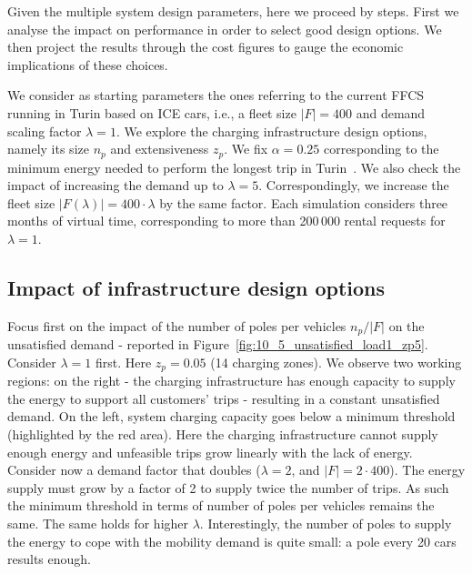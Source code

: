 Given the multiple system design parameters, here we proceed by steps. First we analyse the impact on performance in order to select good design options. We then project the results through the cost figures to gauge the economic implications of these choices.

We consider as starting parameters the ones referring to the current FFCS running in Turin based on ICE cars, i.e., a fleet size $|F|=400$ and demand scaling factor $\lambda=1$. We explore the charging infrastructure design options, namely its size $n_p$ and extensiveness $z_p$. We fix $\alpha=0.25$ corresponding to the minimum energy needed to perform the longest trip in Turin~\cite{7_cocca2019free}.
We also check the impact of increasing the demand up to $\lambda=5$. Correspondingly, we increase the fleet size $|F(\lambda)|=400\cdot \lambda$ by the same factor. Each simulation considers three months of virtual time, corresponding to more than 200\,000 rental requests for $\lambda=1$.

\subsection{Impact of infrastructure design options}

Focus first on the impact of the number of poles per vehicles $n_p/|F|$ on the unsatisfied demand - reported in Figure~\ref{fig:10_5_unsatisfied_load1_zp5}. Consider $\lambda=1$ first. Here $z_p=0.05$ (14 charging zones). We observe two working regions: on the right - the charging infrastructure has enough capacity to supply the energy to support all customers' trips - resulting in a constant unsatisfied demand. On the left, system charging capacity goes below a minimum threshold (highlighted by the red area). Here the charging infrastructure cannot supply enough energy and unfeasible trips grow linearly with the lack of energy.
Consider now a demand factor that doubles ($\lambda=2$, and $|F|=2\cdot 400$). The energy supply must grow by a factor of 2 to supply twice the number of trips. As such the minimum threshold in terms of number of poles per vehicles remains the same. The same holds for higher $\lambda$.
Interestingly, the number of poles to supply the energy to cope with the mobility demand is quite small: a pole every 20 cars results enough.


